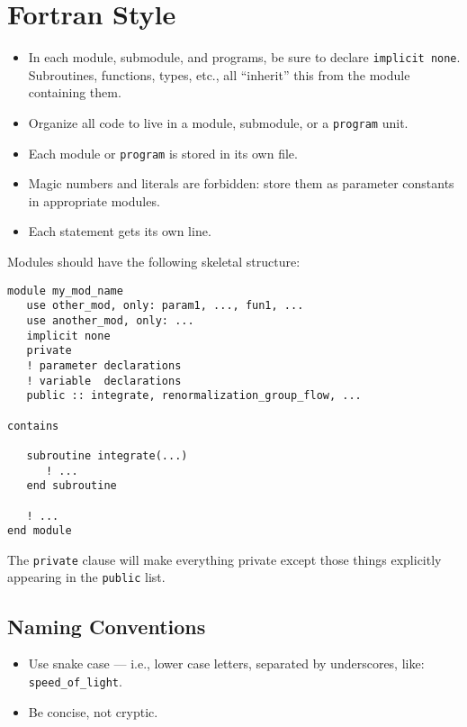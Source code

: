 \chapter{Fortran Style}

\begin{itemize}
\item In each module, submodule, and programs, be sure to declare
  \verb|implicit none|. Subroutines, functions, types, etc., all
  ``inherit'' this from the module containing them.
\item Organize all code to live in a module, submodule, or a
  \verb|program| unit.
\item Each module or \verb|program| is stored in its own file.
\item Magic numbers and literals are forbidden: store them as parameter
  constants in appropriate modules.
\item Each statement gets its own line.
\end{itemize}

Modules should have the following skeletal structure:
\begin{verbatim}
module my_mod_name
   use other_mod, only: param1, ..., fun1, ...
   use another_mod, only: ...
   implicit none
   private
   ! parameter declarations
   ! variable  declarations
   public :: integrate, renormalization_group_flow, ...

contains

   subroutine integrate(...)
      ! ...
   end subroutine

   ! ...
end module
\end{verbatim}
The \verb|private| clause will make everything private except those
things explicitly appearing in the \verb|public| list.

\section{Naming Conventions}

\begin{itemize}
\item Use snake case --- i.e., lower case letters, separated by
  underscores, like: \verb|speed_of_light|.
\item Be concise, not cryptic.
\end{itemize}